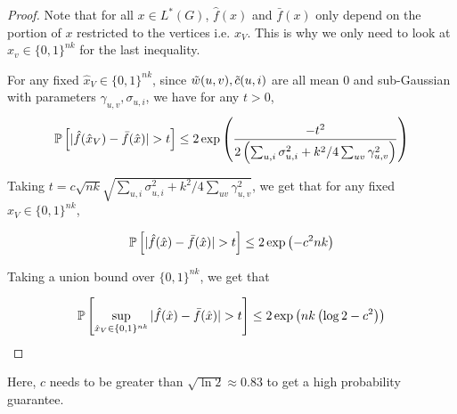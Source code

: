 \begin{proof}
Note that for all $x \in L^*(G)$, $\hat{f}(x)$ and $\bar{f}(x)$ only depend on the portion of $x$ restricted to the vertices i.e. $x_V$. This is why we only need to look at $\hat{x}_v \in \{0,1\}^{nk}$ for the last inequality.

For any fixed $\hat x_V \in \{0,1\}^{nk}$, since $\tilde{w}(u,v), \tilde{c}(u,i)$ are all mean $0$ and sub-Gaussian with parameters $\gamma_{u,v}, \sigma_{u,i}$, we have for any $t > 0$,
\[ \mathbb{P} \left[|\hat f(\hat x_V) - \bar{f}(\hat x)| > t\right] \leq 2\exp\left(\frac{-t^2}{2\left(\sum_{u,i}\sigma_{u,i}^2 + k^2/4\sum_{uv}\gamma_{u,v}^2\right)}\right) \]

Taking $t = c\sqrt{nk}\sqrt{\sum_{u,i}\sigma_{u,i}^2 + k^2/4\sum_{uv}\gamma_{u,v}^2}$, we get that for any fixed $\hat x_V \in \{0,1\}^{nk}$,

\[ \mathbb{P} \left[|\hat f(\hat x) - \bar{f}(\hat x)| > t\right] \leq 2\exp\left(-c^2 nk\right) \]

Taking a union bound over $\{0,1\}^{nk}$, we get that

\[ \mathbb{P} \left[ \sup_{\hat x_V \in \{0,1\}^{nk}}  |\hat f(\hat x) - \bar{f}(\hat x)| > t\right] \leq 2\exp\left(nk\left(\log 2 - c^2\right)\right) \]
\end{proof}

Here, $c$ needs to be greater than $\sqrt{\ln 2} \approx 0.83$ to get a high probability guarantee.

